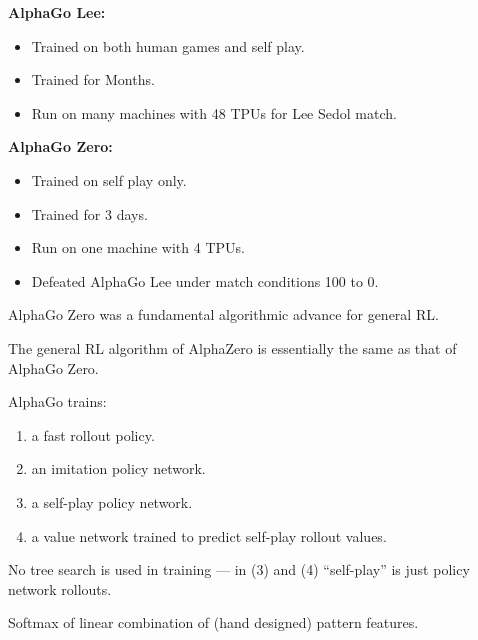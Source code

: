 {

{\bf AlphaGo Lee:}

\begin{itemize}
\item Trained on both human games and self play.
  
\item Trained for Months.

\item Run on many machines with 48 TPUs for Lee Sedol match.
\end{itemize}

{\bf AlphaGo Zero:}
\begin{itemize}
\item Trained on self play only.
  
\item Trained for 3 days.

\item Run on one machine with 4 TPUs.

\item Defeated AlphaGo Lee under match conditions 100 to 0.
\end{itemize}


AlphaGo Zero was a fundamental algorithmic advance for general RL.

\vfill
The general RL algorithm of AlphaZero is essentially the same as that of AlphaGo Zero.


AlphaGo trains:

\begin{enumerate}
\item a fast rollout policy.

\item an imitation policy network.

\item a self-play policy network.

\item a value network trained to predict self-play rollout values.
\end{enumerate}

\vfill
No tree search is used in training --- in (3) and (4) ``self-play'' is just policy network rollouts.


Softmax of linear combination of (hand designed) pattern features.

}
